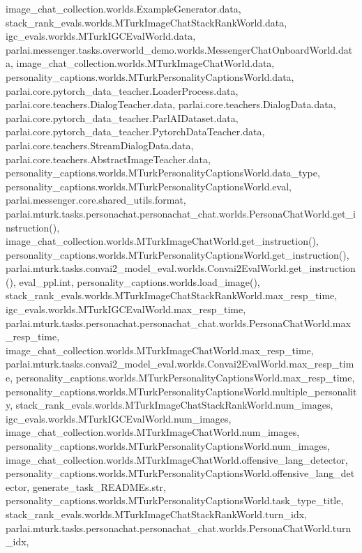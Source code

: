 image\+\_\+chat\+\_\+collection.\+worlds.\+Example\+Generator.\+data, stack\+\_\+rank\+\_\+evals.\+worlds.\+M\+Turk\+Image\+Chat\+Stack\+Rank\+World.\+data, igc\+\_\+evals.\+worlds.\+M\+Turk\+I\+G\+C\+Eval\+World.\+data, parlai.\+messenger.\+tasks.\+overworld\+\_\+demo.\+worlds.\+Messenger\+Chat\+Onboard\+World.\+data, image\+\_\+chat\+\_\+collection.\+worlds.\+M\+Turk\+Image\+Chat\+World.\+data, personality\+\_\+captions.\+worlds.\+M\+Turk\+Personality\+Captions\+World.\+data, parlai.\+core.\+pytorch\+\_\+data\+\_\+teacher.\+Loader\+Process.\+data, parlai.\+core.\+teachers.\+Dialog\+Teacher.\+data, parlai.\+core.\+teachers.\+Dialog\+Data.\+data, parlai.\+core.\+pytorch\+\_\+data\+\_\+teacher.\+Parl\+A\+I\+Dataset.\+data, parlai.\+core.\+pytorch\+\_\+data\+\_\+teacher.\+Pytorch\+Data\+Teacher.\+data, parlai.\+core.\+teachers.\+Stream\+Dialog\+Data.\+data, parlai.\+core.\+teachers.\+Abstract\+Image\+Teacher.\+data, personality\+\_\+captions.\+worlds.\+M\+Turk\+Personality\+Captions\+World.\+data\+\_\+type, personality\+\_\+captions.\+worlds.\+M\+Turk\+Personality\+Captions\+World.\+eval, parlai.\+messenger.\+core.\+shared\+\_\+utils.\+format, parlai.\+mturk.\+tasks.\+personachat.\+personachat\+\_\+chat.\+worlds.\+Persona\+Chat\+World.\+get\+\_\+instruction(), image\+\_\+chat\+\_\+collection.\+worlds.\+M\+Turk\+Image\+Chat\+World.\+get\+\_\+instruction(), personality\+\_\+captions.\+worlds.\+M\+Turk\+Personality\+Captions\+World.\+get\+\_\+instruction(), parlai.\+mturk.\+tasks.\+convai2\+\_\+model\+\_\+eval.\+worlds.\+Convai2\+Eval\+World.\+get\+\_\+instruction(), eval\+\_\+ppl.\+int, personality\+\_\+captions.\+worlds.\+load\+\_\+image(), stack\+\_\+rank\+\_\+evals.\+worlds.\+M\+Turk\+Image\+Chat\+Stack\+Rank\+World.\+max\+\_\+resp\+\_\+time, igc\+\_\+evals.\+worlds.\+M\+Turk\+I\+G\+C\+Eval\+World.\+max\+\_\+resp\+\_\+time, parlai.\+mturk.\+tasks.\+personachat.\+personachat\+\_\+chat.\+worlds.\+Persona\+Chat\+World.\+max\+\_\+resp\+\_\+time, image\+\_\+chat\+\_\+collection.\+worlds.\+M\+Turk\+Image\+Chat\+World.\+max\+\_\+resp\+\_\+time, parlai.\+mturk.\+tasks.\+convai2\+\_\+model\+\_\+eval.\+worlds.\+Convai2\+Eval\+World.\+max\+\_\+resp\+\_\+time, personality\+\_\+captions.\+worlds.\+M\+Turk\+Personality\+Captions\+World.\+max\+\_\+resp\+\_\+time, personality\+\_\+captions.\+worlds.\+M\+Turk\+Personality\+Captions\+World.\+multiple\+\_\+personality, stack\+\_\+rank\+\_\+evals.\+worlds.\+M\+Turk\+Image\+Chat\+Stack\+Rank\+World.\+num\+\_\+images, igc\+\_\+evals.\+worlds.\+M\+Turk\+I\+G\+C\+Eval\+World.\+num\+\_\+images, image\+\_\+chat\+\_\+collection.\+worlds.\+M\+Turk\+Image\+Chat\+World.\+num\+\_\+images, personality\+\_\+captions.\+worlds.\+M\+Turk\+Personality\+Captions\+World.\+num\+\_\+images, image\+\_\+chat\+\_\+collection.\+worlds.\+M\+Turk\+Image\+Chat\+World.\+offensive\+\_\+lang\+\_\+detector, personality\+\_\+captions.\+worlds.\+M\+Turk\+Personality\+Captions\+World.\+offensive\+\_\+lang\+\_\+detector, generate\+\_\+task\+\_\+\+R\+E\+A\+D\+M\+Es.\+str, personality\+\_\+captions.\+worlds.\+M\+Turk\+Personality\+Captions\+World.\+task\+\_\+type\+\_\+title, stack\+\_\+rank\+\_\+evals.\+worlds.\+M\+Turk\+Image\+Chat\+Stack\+Rank\+World.\+turn\+\_\+idx, parlai.\+mturk.\+tasks.\+personachat.\+personachat\+\_\+chat.\+worlds.\+Persona\+Chat\+World.\+turn\+\_\+idx, 